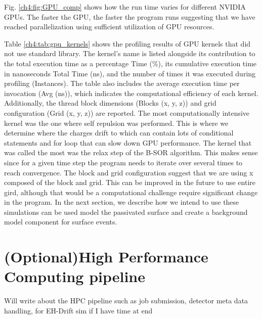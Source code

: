 Fig. \ref{ch4:fig:GPU_comp} shows how the run time varies for different NVIDIA GPUs. The faster the GPU, the faster the program runs suggesting that we have reached parallelization using sufficient utilization of GPU resources.


Table \ref{ch4:tab:gpu_kernels} shows the profiling results of GPU kernels that did not use standard library. The kernel's name is listed alongside its contribution to the total execution time as a percentage Time (\%), its cumulative execution time in nanoseconds Total Time (ns), and the number of times it was executed during profiling (Instances). The table also includes the average execution time per invocation (Avg (ns)), which indicates the computational efficiency of each kernel. Additionally, the thread block dimensions (Blocks (x, y, z)) and grid configuration (Grid (x, y, z)) are reported. The most computationally intensive kernel was the one where self repulsion was performed. This is where we determine where the charges drift to which can contain lots of conditional statements and for loop that can slow down GPU performance. The kernel that was called the most was the relax step of the B-SOR algorithm. This makes sense since for a given time step the program needs to iterate over several times to reach convergence. The block and grid configuration suggest that we are using x composed of the block and grid. This can be improved in the future to use entire gird, although that would be a computational challenge require significant change in the program. In the next section, we describe how we intend to use these simulations can be used model the passivated surface and create a background model component for surface events.

\section{(Optional)High Performance Computing pipeline}
Will write about the HPC pipeline such as job submission, detector meta data handling, for EH-Drift sim if I have time at end 